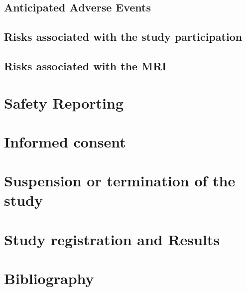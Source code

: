 \subsection{Anticipated Adverse Events}

\subsection{Risks associated with the study participation}

\subsection{Risks associated with the \ac{MRI}}

\section{Safety Reporting}

\section{Informed consent}

\section{Suspension or termination of the study}

\section{Study registration and Results}

\section{Bibliography}
